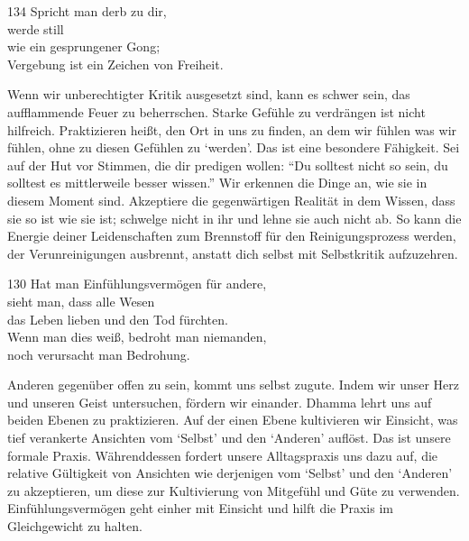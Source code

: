 
\begin{dhpVerse}{134}
\label{dhp-134}
Spricht man derb zu dir,\\ 
werde still\\ 
wie ein gesprungener Gong;\\ 
Vergebung ist ein Zeichen von Freiheit. 
\end{dhpVerse}

\begin{dhpRefl}

Wenn wir unberechtigter Kritik ausgesetzt sind, kann es schwer sein, das
aufflammende Feuer zu beherrschen. Starke Gefühle zu verdrängen ist nicht
hilfreich. Praktizieren heißt, den Ort in uns zu finden, an dem wir fühlen was
wir fühlen, ohne zu diesen Gefühlen zu `werden'. Das ist eine besondere
Fähigkeit. Sei auf der Hut vor Stimmen, die dir predigen wollen: “Du solltest
nicht so sein, du solltest es mittlerweile besser wissen.” Wir erkennen die
Dinge an, wie sie in diesem Moment sind. Akzeptiere die gegenwärtigen Realität
in dem Wissen, dass sie so ist wie sie ist; schwelge nicht in ihr und lehne
sie auch nicht ab. So kann die Energie deiner Leidenschaften zum Brennstoff
für den Reinigungsprozess werden, der Verunreinigungen ausbrennt, anstatt dich
selbst mit Selbstkritik aufzuzehren.

\end{dhpRefl}


\begin{dhpVerse}{130}
\label{dhp-130}
Hat man Einfühlungsvermögen für andere,\\ 
sieht man, dass alle Wesen\\ 
das Leben lieben und den Tod fürchten.\\ 
Wenn man dies weiß, bedroht man niemanden,\\ 
noch verursacht man Bedrohung. 
\end{dhpVerse}

\begin{dhpRefl}

Anderen gegenüber offen zu sein, kommt uns selbst zugute. Indem wir unser Herz
und unseren Geist untersuchen, fördern wir einander. Dhamma lehrt uns auf
beiden Ebenen zu praktizieren. Auf der einen Ebene kultivieren wir Einsicht,
was tief verankerte Ansichten vom `Selbst' und den `Anderen' auflöst. Das ist
unsere formale Praxis. Währenddessen fordert unsere Alltagspraxis uns dazu
auf, die relative Gültigkeit von Ansichten wie derjenigen vom `Selbst' und den
`Anderen' zu akzeptieren, um diese zur Kultivierung von Mitgefühl und Güte zu
verwenden. Einfühlungsvermögen geht einher mit Einsicht und hilft die Praxis
im Gleichgewicht zu halten.

\end{dhpRefl}

